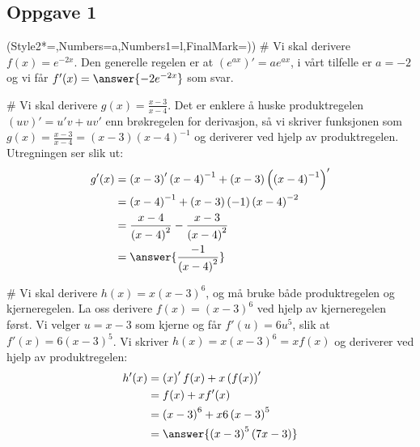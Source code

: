 \subsection*{Oppgave 1}
\begin{easylist}[enumerate]
\ListProperties(Style2*=,Numbers=a,Numbers1=l,FinalMark={)})
# Vi skal derivere $f(x) = e^{-2x}$. Den generelle regelen er at $\left( e^{ax} \right)' = a e^{ax}$, i vårt tilfelle er $a = -2$ og vi får $f'(x) = \answer{-2 e^{-2x}}$ som svar.

# Vi skal derivere $g(x) = \frac{x-3}{x-4}$. Det er enklere å huske produktregelen $\left(uv\right)' = u'v + uv'$ enn brøkregelen for derivasjon, så vi skriver funksjonen som $g(x) = \frac{x-3}{x-4} = \left( x-3 \right) \left( x-4 \right)^{-1}$ og deriverer ved hjelp av produktregelen. Utregningen ser slik ut:
\begin{align*}
	g'(x) &= \left( x-3 \right)' \left( x-4 \right)^{-1} + \left( x-3 \right) \left(\left( x-4 \right)^{-1}\right)' \\
	&= \left( x-4 \right)^{-1} + \left( x-3 \right) (-1 )\left( x-4 \right)^{-2} \\
	&= \frac{x-4}{\left( x-4 \right)^{2}} - \frac{x-3}{\left( x-4 \right)^{2}} \\
	&= \answer{\frac{-1}{\left( x-4 \right)^{2}}}
\end{align*}

# Vi skal derivere $h(x) = x \left(x-3\right)^6$, og må bruke både produktregelen og kjerneregelen.
La oss derivere $f(x) = \left(x-3\right)^6$ ved hjelp av kjerneregelen først. Vi velger $u = x-3$ som kjerne og får $f'(u) = 6u^5$, slik at $f'(x) = 6\left(x-3\right)^5$. Vi skriver $h(x) = x  \left(x-3\right)^6= x f(x) $ og deriverer ved hjelp av produktregelen:
\begin{align*}
	h'(x) &= \left( x \right)' f(x) + x \left( f(x) \right)' \\
	&= f(x) + xf'(x) \\
	&= \left(x-3\right)^6 + x6\left(x-3\right)^5 \\
	&= \answer{\left(x-3\right)^5 \left( 7x - 3\right)}
\end{align*}
\end{easylist}

